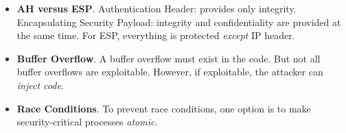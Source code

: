 \documentclass[twocolumn]{article}
\begin{document}
\begin{itemize}
\item \textbf{AH versus ESP}. Authentication Header: provides only
  integrity. Encapsulating Security Payload: integrity and
  confidentiality are provided at the same time. For ESP, everything
  is protected \emph{except} IP header. 
\item \textbf{Buffer Overflow}. A buffer overflow must exist in the
  code. But not all buffer overflows are exploitable. However, if
  exploitable, the attacker can \emph{inject code}.
\item \textbf{Race Conditions}. To prevent race conditions, one option
  is to make security-critical processes \emph{atomic}.



\end{itemize}
\end{document}
